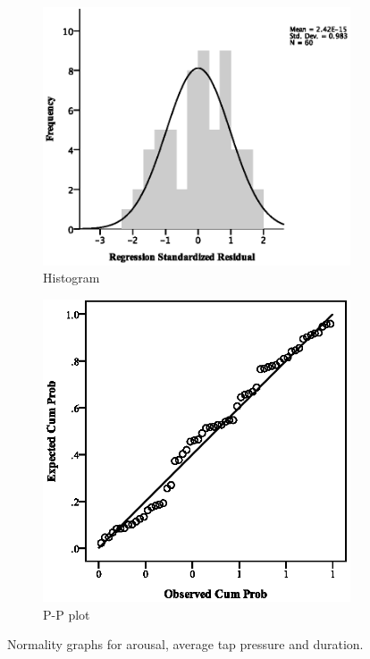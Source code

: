 \par\bigskip
\par\bigskip
\begin{figure}[ht]
\centering
\begin{subfigure}[b]{0.45\textwidth}
    \centering
    \includegraphics[width=\textwidth]{images/normality/aravg/HistArAvg.eps}
    \caption{Histogram}
    \label{fig:histaravg}
\end{subfigure}
\quad
\begin{subfigure}[b]{0.45\textwidth}
    \centering
    \includegraphics[width=\textwidth]{images/normality/aravg/PPArAvg.eps}
    \caption{P-P plot}
    \label{fig:pparavg}
\end{subfigure}
\caption{Normality graphs for arousal, average tap pressure and duration.}
\end{figure}